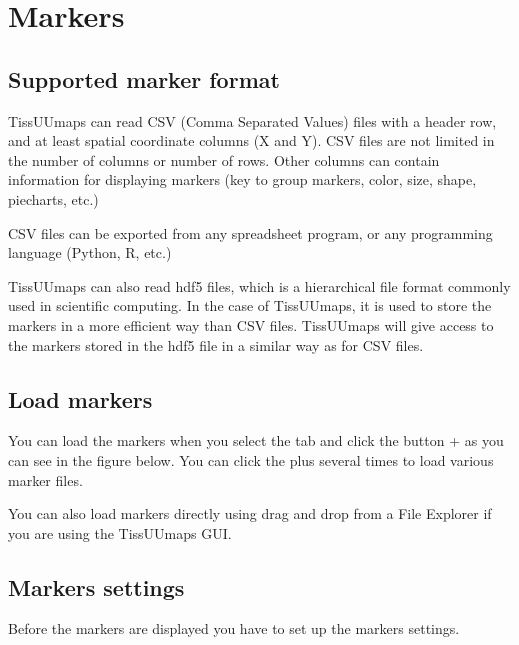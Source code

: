 \documentclass[letterpaper,10pt,english,openany,oneside]{sphinxmanual}
\begin{document}
\sphinxAtStartPar
{}

\sphinxstepscope


\section{Markers}
\label{\detokenize{docs/starting/markers:markers}}\label{\detokenize{docs/starting/markers::doc}}

\subsection{Supported marker format}
\label{\detokenize{docs/starting/markers:supported-marker-format}}
\sphinxAtStartPar
TissUUmaps can read CSV (Comma Separated Values) files with a header row, and at least spatial coordinate columns (X and Y). CSV files are not limited in the number of columns or number of rows. Other columns can contain information for displaying markers (key to group markers, color, size, shape, piecharts, etc.)

\sphinxAtStartPar
CSV files can be exported from any spreadsheet program, or any programming language (Python, R, etc.)

\sphinxAtStartPar
TissUUmaps can also read hdf5 files, which is  a hierarchical file format commonly used in scientific computing. In the case of TissUUmaps, it is used to store the markers in a more efficient way than CSV files. TissUUmaps will give access to the markers stored in the hdf5 file in a similar way as for CSV files.


\subsection{Load markers}
\label{\detokenize{docs/starting/markers:load-markers}}
\sphinxAtStartPar
You can load the markers when you select the  tab and click the button + as you can see in the figure below. You can click the plus several times to load various marker files.

\sphinxAtStartPar
You can also load markers directly using drag and drop from a File Explorer if you are using the TissUUmaps GUI.


\subsection{Markers settings}
\label{\detokenize{docs/starting/markers:markers-settings}}
\sphinxAtStartPar
Before the markers are displayed you have to set up the markers settings.
\end{document}
